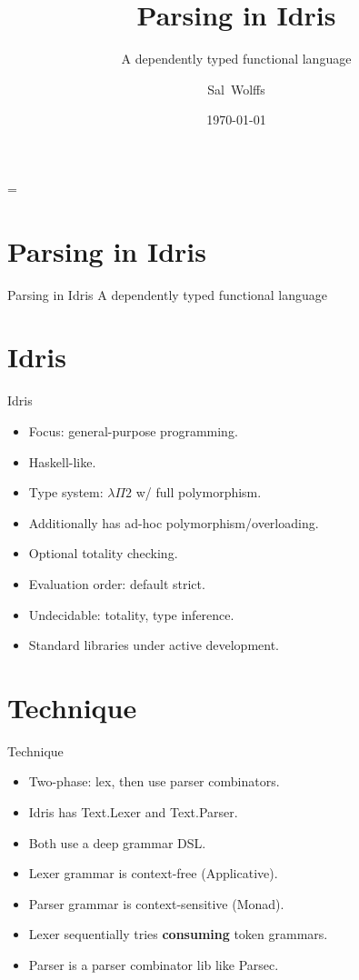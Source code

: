 \documentclass
  [ department=icis
  , notes={show notes}
  , slidesperpage=1
  , nohandout
  , official=true
  ] {beamerruhuisstijl}
\newcommand{\frameAndSection}[1]{\section{#1}\begin{frame}{#1}}
\begin{document}
\title{Parsing in Idris}
\subtitle{A dependently typed functional language}
\author{Sal~Wolffs}
\date{\today}

\begin{frame}
  \hfuzz=\maxdimen
  \titlepage
  \maketitle
\end{frame}

\frameAndSection{Parsing in Idris}
  A dependently typed functional language
\end{frame}


\frameAndSection{Idris}
\onslide<+->
\begin{itemize}
    \onslide<+->\item Focus: general-purpose programming.
    \onslide<+->\item Haskell-like.
    \onslide<+->\item Type system: $\lambda\Pi 2$ w/ full polymorphism.
    \onslide<+->\item Additionally has ad-hoc polymorphism/overloading.
    \onslide<+->\item Optional totality checking.
    \onslide<+->\item Evaluation order: default strict.
    \onslide<+->\item Undecidable: totality, type inference.
    \onslide<+->\item Standard libraries under active development.
\end{itemize}
\end{frame}

\frameAndSection{Technique}
\onslide<+->
\begin{itemize} 
    \onslide<+->\item Two-phase: lex, then use parser combinators.
    \onslide<+->\item Idris has Text.Lexer and Text.Parser.
    \onslide<+->\item Both use a deep grammar DSL.
    \onslide<+->\item Lexer grammar is context-free (Applicative).
    \onslide<+->\item Parser grammar is context-sensitive (Monad).
    \onslide<+->\item Lexer sequentially tries \textbf{consuming} token grammars.
    \onslide<+->\item Parser is a parser combinator lib like Parsec.
\end{itemize}
\end{frame}
\end{document}
